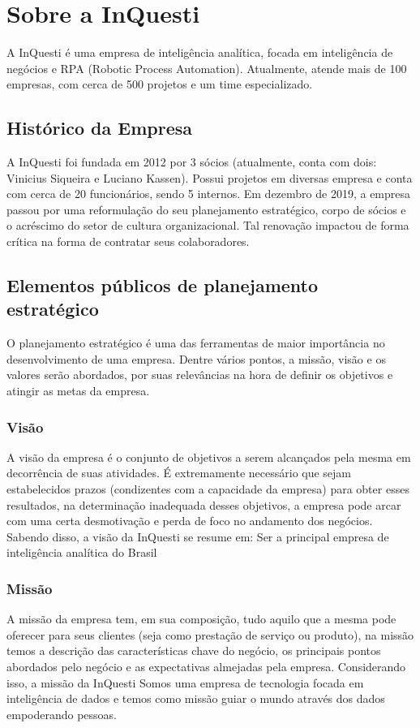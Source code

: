 \chapter{Sobre a InQuesti}
A InQuesti é uma empresa de inteligência analítica, focada em inteligência de negócios e RPA (Robotic Process Automation). Atualmente, atende mais de 100 empresas, com cerca de 500 projetos e um time especializado.

\section{Histórico da Empresa}
A InQuesti foi fundada em 2012 por 3 sócios (atualmente, conta com dois: Vinicius Siqueira e Luciano Kassen). Possui projetos em diversas empresa e conta com cerca de 20 funcionários, sendo 5 internos. Em dezembro de 2019, a empresa passou por uma reformulação do seu planejamento estratégico, corpo de sócios e o acréscimo do setor de cultura organizacional. Tal renovação impactou de forma crítica na forma de contratar seus colaboradores.

\section{Elementos públicos de planejamento estratégico}
O planejamento estratégico é uma das ferramentas de maior importância no desenvolvimento de uma empresa. Dentre vários pontos, a missão, visão e os valores serão abordados, por suas relevâncias na hora de definir os objetivos e atingir as metas da empresa.

\subsection{Visão}
A visão da empresa é o conjunto de objetivos a serem alcançados pela mesma em decorrência de suas atividades. É extremamente necessário que sejam estabelecidos prazos (condizentes com a capacidade da empresa) para obter esses resultados, na determinação inadequada desses objetivos, a empresa pode arcar com uma certa desmotivação e perda de foco no andamento dos negócios. Sabendo disso, a visão da InQuesti se resume em: 
Ser a principal empresa de inteligência analítica do Brasil

\subsection{Missão}
A missão da empresa tem, em sua composição, tudo aquilo que a mesma pode oferecer para seus clientes (seja como prestação de serviço ou produto), na missão temos a descrição das características chave do negócio, os principais pontos abordados pelo negócio e as expectativas almejadas pela empresa. Considerando isso, a missão da InQuesti 
Somos uma empresa de tecnologia focada em inteligência de dados e temos como missão guiar o mundo através dos dados empoderando pessoas.

